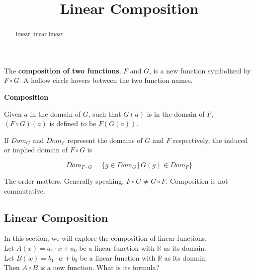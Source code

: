 \documentclass{ximera}
\title{Linear Composition}
\begin{document}
\begin{abstract}
linear linear linear
\end{abstract}
\maketitle


The \textbf{\textcolor{purple!85!blue}{composition of two functions}}, $F$ and $G$, is a new function symbolized by $F \circ G$. A hollow circle hovers between the two function names.


\begin{definition} \textbf{\textcolor{green!50!black}{Composition}} 


Given $a$ in the domain of $G$, such that $G(a)$ is in the domain of $F$, $(F \circ G)(a)$ is defined to be  $F(G(a))$.


If $Dom_G$ and $Dom_F$ represent the domains of $G$ and $F$ respectively, the induced or implied domain of $F \circ G$ is 




\[  Dom_{F \circ G} = \{  g \in  Dom_G  \,   |   \,   G(g) \in Dom_F                 \}           \]

\end{definition}

The order matters.  Generally speaking, $F \circ G \ne G \circ F$. Composition is not commutative.


















\subsection*{Linear Composition}

In this section, we will explore the composition of linear functions. \\


Let $A(x) = a_1 \cdot x + a_0$ be a linear function with $\mathbb{R}$ as its domain. \\
Let $B(w) = b_1 \cdot w + b_0$ be a linear function with $\mathbb{R}$ as its domain. \\


Then $A \circ B$ is a new function. What is its formula? \\
\end{document}
